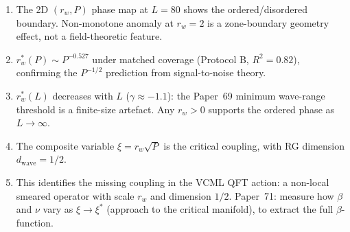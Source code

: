 \documentclass[twocolumn,10pt]{article}
\begin{document}
\begin{enumerate}
  \item The 2D $(r_w, P)$ phase map at $L=80$ shows the ordered/disordered
        boundary.
        Non-monotone anomaly at $r_w=2$ is a zone-boundary geometry effect,
        not a field-theoretic feature.
  \item $r_w^*(P)\sim P^{-0.527}$ under matched coverage (Protocol B, $R^2=0.82$),
        confirming the $P^{-1/2}$ prediction from signal-to-noise theory.
  \item $r_w^*(L)$ decreases with $L$ ($\gamma\approx-1.1$):
        the Paper~69 minimum wave-range threshold is a finite-size artefact.
        Any $r_w>0$ supports the ordered phase as $L\to\infty$.
  \item The composite variable $\xi=r_w\sqrt{P}$ is the critical coupling,
        with RG dimension $d_\mathrm{wave}=1/2$.
  \item This identifies the missing coupling in the VCML QFT action:
        a non-local smeared operator with scale $r_w$ and dimension $1/2$.
        Paper~71: measure how $\beta$ and $\nu$ vary as $\xi\to\xi^*$
        (approach to the critical manifold), to extract the full $\beta$-function.
\end{enumerate}
\end{document}
